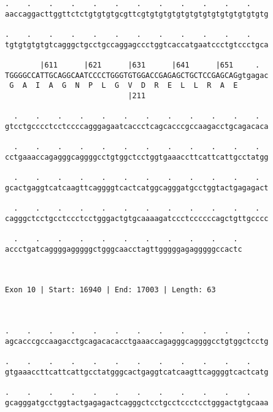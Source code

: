 \documentclass{article}
\begin{document}
\begin{Verbatim}
.    .    .    .    .    .    .    .    .    .    .    .    
aaccaggacttggttctctgtgtgtgcgttcgtgtgtgtgtgtgtgtgtgtgtgtgtgtg
                                                            
.    .    .    .    .    .    .    .    .    .    .    .    
tgtgtgtgtgtcagggctgcctgccaggagccctggtcaccatgaatccctgtccctgca
                                                            
        |611      |621      |631      |641      |651     .  
TGGGGCCATTGCAGGCAATCCCCTGGGTGTGGACCGAGAGCTGCTCCGAGCAGgtgagac
 G  A  I  A  G  N  P  L  G  V  D  R  E  L  L  R  A  E       
                            |211                            
  
  .    .    .    .    .    .    .    .    .    .    .    .  
gtcctgcccctcctccccagggagaatcaccctcagcacccgccaagacctgcagacaca
                                                            
  .    .    .    .    .    .    .    .    .    .    .    .  
cctgaaaccagagggcaggggcctgtggctcctggtgaaaccttcattcattgcctatgg
                                                            
  .    .    .    .    .    .    .    .    .    .    .    .  
gcactgaggtcatcaagttcaggggtcactcatggcagggatgcctggtactgagagact
                                                            
  .    .    .    .    .    .    .    .    .    .    .    .  
cagggctcctgcctccctcctgggactgtgcaaaagatccctccccccagctgttgcccc
                                                            
  .    .    .    .    .    .    .    .    .    .    . 
accctgatcaggggagggggctgggcaacctagttgggggagagggggccactc
                                                      
                                                      
 
Exon 10 | Start: 16940 | End: 17003 | Length: 63



.    .    .    .    .    .    .    .    .    .    .    .    
agcacccgccaagacctgcagacacacctgaaaccagagggcaggggcctgtggctcctg
                                                            
.    .    .    .    .    .    .    .    .    .    .    .    
gtgaaaccttcattcattgcctatgggcactgaggtcatcaagttcaggggtcactcatg
                                                            
.    .    .    .    .    .    .    .    .    .    .    .    
gcagggatgcctggtactgagagactcagggctcctgcctccctcctgggactgtgcaaa
                                                            

\end{Verbatim}
\end{document}

